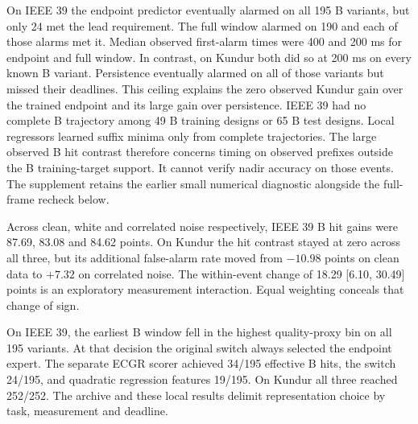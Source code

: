 \documentclass[10pt]{article}
\begin{document}
On IEEE 39 the endpoint predictor eventually alarmed on all 195 B variants, but only 24 met the lead requirement. The full window alarmed on 190 and each of those alarms met it. Median observed first-alarm times were 400 and 200 ms for endpoint and full window. In contrast, on Kundur both did so at 200 ms on every known B variant. Persistence eventually alarmed on all of those variants but missed their deadlines. This ceiling explains the zero observed Kundur gain over the trained endpoint and its large gain over persistence. IEEE 39 had no complete B trajectory among 49 B training designs or 65 B test designs. Local regressors learned suffix minima only from complete trajectories. The large observed B hit contrast therefore concerns timing on observed prefixes outside the B training-target support. It cannot verify nadir accuracy on those events. The supplement retains the earlier small numerical diagnostic alongside the full-frame recheck below.

Across clean, white and correlated noise respectively, IEEE 39 B hit gains were 87.69, 83.08 and 84.62 points. On Kundur the hit contrast stayed at zero across all three, but its additional false-alarm rate moved from $-10.98$ points on clean data to $+7.32$ on correlated noise. The within-event change of 18.29 [6.10, 30.49] points is an exploratory measurement interaction. Equal weighting conceals that change of sign.

On IEEE 39, the earliest B window fell in the highest quality-proxy bin on all 195 variants. At that decision the original switch always selected the endpoint expert. The separate ECGR scorer achieved 34/195 effective B hits, the switch 24/195, and quadratic regression features 19/195. On Kundur all three reached 252/252. The archive and these local results delimit representation choice by task, measurement and deadline.
\end{document}
